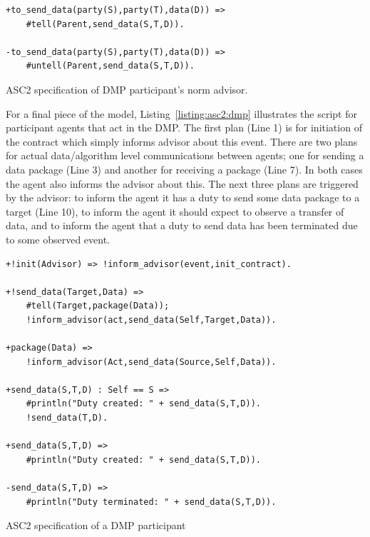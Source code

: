 \begin{listing}[!tbh]
\begin{tcolorbox}[left=2pt,right=2pt,top=2pt,bottom=2pt,arc=0pt,
                  boxrule=0pt,toprule=1pt,
                  colback=white]
\begin{verbatim}
+to_send_data(party(S),party(T),data(D)) =>
    #tell(Parent,send_data(S,T,D)).

-to_send_data(party(S),party(T),data(D)) =>
    #untell(Parent,send_data(S,T,D)).
\end{verbatim}
\end{tcolorbox}
\caption{ASC2 specification of DMP participant's norm advisor.}
\label{asc:advisor}
\label{listing:advisor:dmp}
\end{listing}

For a final piece of the model, Listing~\ref{listing:asc2:dmp} illustrates the script for participant agents that act in the DMP. The first plan (Line 1) is for initiation of the contract which simply informs advisor about this event. There are two plans for actual data/algorithm level communications between agents; one for sending a data package (Line 3) and another for receiving a package (Line 7). In both cases the agent also informs the advisor about this. The next three plans are triggered by the advisor: to inform the agent it has a duty to send some data package to a target (Line 10), to inform the agent it should expect to observe a transfer of data, and to inform the agent that a duty to send data has been terminated due to some observed event.

\begin{listing}[!tbh]
\centering
\begin{tcolorbox}[left=2pt,right=2pt,top=2pt,bottom=2pt,arc=0pt,
                  boxrule=0pt,toprule=1pt,
                  colback=white]
\begin{verbatim}
+!init(Advisor) => !inform_advisor(event,init_contract).

+!send_data(Target,Data) =>
    #tell(Target,package(Data));
    !inform_advisor(act,send_data(Self,Target,Data)).

+package(Data) =>
    !inform_advisor(Act,send_data(Source,Self,Data)).

+send_data(S,T,D) : Self == S =>
    #println("Duty created: " + send_data(S,T,D)).
    !send_data(T,D).

+send_data(S,T,D) =>
    #println("Duty created: " + send_data(S,T,D)).

-send_data(S,T,D) =>
    #println("Duty terminated: " + send_data(S,T,D)).
\end{verbatim}
\end{tcolorbox}
\caption{ASC2 specification of a DMP participant}

\label{listing:asc2:dmp}
\end{listing}

